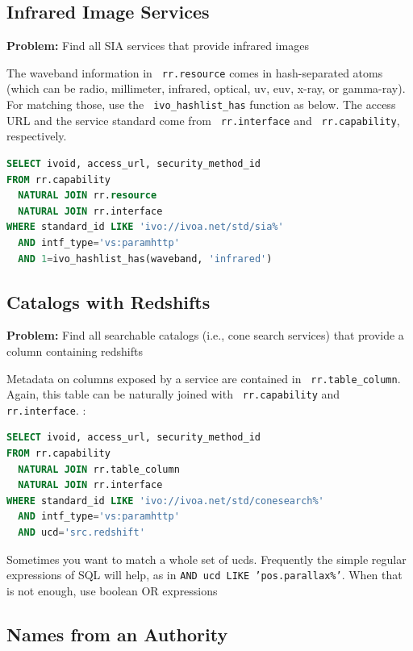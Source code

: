 \documentclass[11pt,a4paper]{ivoa}
\newcommand{\rtent}[1]{\texttt{\color{rtcolor} #1}}
\begin{document}
\subsection{Infrared Image Services}

\textbf{Problem:} Find all SIA services that provide infrared
images

The waveband information in 
\rtent{rr.resource} 
comes in hash-separated atoms (which can be
radio, millimeter, infrared, optical, uv, euv, x-ray, or gamma-ray).
For matching those, use the \rtent{ivo\_hashlist\_has} function as
below.  The access URL and the service standard come from 
\rtent{rr.interface} and 
\rtent{rr.capability}, respectively.


\begin{lstlisting}[language=SQL,flexiblecolumns=true]
SELECT ivoid, access_url, security_method_id
FROM rr.capability 
  NATURAL JOIN rr.resource
  NATURAL JOIN rr.interface
WHERE standard_id LIKE 'ivo://ivoa.net/std/sia%'
  AND intf_type='vs:paramhttp'
  AND 1=ivo_hashlist_has(waveband, 'infrared')
\end{lstlisting}

\subsection{Catalogs with Redshifts}
\textbf{Problem:} Find all searchable catalogs (i.e., cone search
services) that provide a column containing redshifts

Metadata on columns exposed by a service are contained in 
\rtent{rr.table\_column}.  Again, this table can be
naturally joined with 
\rtent{rr.capability} and 
\rtent{rr.interface}.
:
\begin{lstlisting}[language=SQL,flexiblecolumns=true]
SELECT ivoid, access_url, security_method_id
FROM rr.capability 
  NATURAL JOIN rr.table_column
  NATURAL JOIN rr.interface 
WHERE standard_id LIKE 'ivo://ivoa.net/std/conesearch%'
  AND intf_type='vs:paramhttp'
  AND ucd='src.redshift'
\end{lstlisting}

Sometimes you want to match a whole set of ucds.  Frequently the
simple regular expressions of SQL will help, as in 
\texttt{AND ucd LIKE 'pos.parallax\%'}.  When that is not enough, 
use boolean OR expressions 

\subsection{Names from an Authority}
\end{document}
